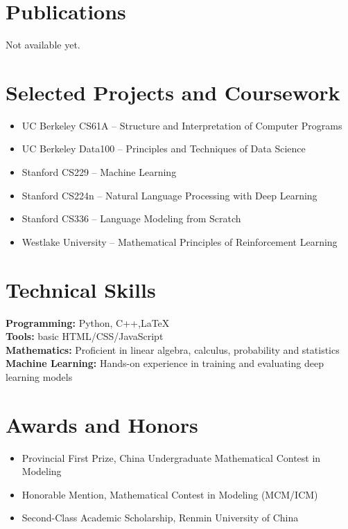 \documentclass[11pt,a4paper]{article}
\begin{document}
\section*{Publications}
Not available yet.

\section*{Selected Projects and Coursework}
\begin{itemize}
  \item UC Berkeley CS61A -- Structure and Interpretation of Computer Programs
  \item UC Berkeley Data100 -- Principles and Techniques of Data Science
  \item Stanford CS229 -- Machine Learning
  \item Stanford CS224n -- Natural Language Processing with Deep Learning
  \item Stanford CS336 -- Language Modeling from Scratch
  \item Westlake University -- Mathematical Principles of Reinforcement Learning
\end{itemize}

\section*{Technical Skills}
\textbf{Programming:} Python, C++,LaTeX\\
\textbf{Tools:}  basic HTML/CSS/JavaScript \\
\textbf{Mathematics:} Proficient in linear algebra, calculus, probability and statistics \\
\textbf{Machine Learning:} Hands-on experience in training and evaluating deep learning models

\section*{Awards and Honors}
\begin{itemize}
  \item Provincial First Prize, China Undergraduate Mathematical Contest in Modeling
  \item Honorable Mention, Mathematical Contest in Modeling (MCM/ICM)
  \item Second-Class Academic Scholarship, Renmin University of China
\end{itemize}
\end{document}
